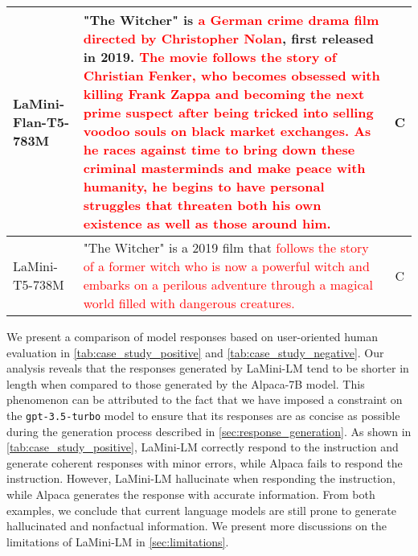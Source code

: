 \documentclass[11pt]{article}
\newcommand{\modelname}{LaMini\xspace}
\newcommand{\modelnamefull}{LaMini-LM\xspace}
\newcommand{\llm}[1]{\texttt{#1}\xspace}
\newcommand{\chatgpt}{\llm{gpt-3.5-turbo}}
\begin{document}
\begin{table*}[t]
\begin{tabular}{lp{}c}
\modelname-Flan-T5-783M & "The Witcher" is \textcolor{red}{a German crime drama film directed by Christopher Nolan}, first released in 2019. \textcolor{red}{The movie follows the story of Christian Fenker, who becomes obsessed with killing Frank Zappa and becoming the next prime suspect after being tricked into selling voodoo souls on black market exchanges. As he races against time to bring down these criminal masterminds and make peace with humanity, he begins to have personal struggles that threaten both his own existence as well as those around him.}   & C       \\ \midrule
\modelname-T5-738M & "The Witcher" is a 2019 film that \textcolor{red}{follows the story of a former witch who is now a powerful witch and embarks on a perilous adventure through a magical world filled with dangerous creatures.}   &  C \\ \bottomrule     
\end{tabular}
\caption{
Model responses to the instruction ``\texttt{Write a short description about the given movie or series: "The Witcher (2019)"}'', where \modelname language models fails but Alpaca-7B manages to respond.
The high-quality contents are highlighted in \textcolor{blue}{blue}.
The errors are highlighted in \textcolor{red}{red}.
}
\label{tab:case_study_negative}
\end{table*} 
We present a comparison of model responses based on user-oriented human evaluation in \autoref{tab:case_study_positive} and \autoref{tab:case_study_negative}. Our analysis reveals that the responses generated by \modelnamefull tend to be shorter in length when compared to those generated by the Alpaca-7B model. This phenomenon can be attributed to the fact that we have imposed a constraint on the \chatgpt model to ensure that its responses are as concise as possible during the generation process described in \autoref{sec:response_generation}. 
As shown in \autoref{tab:case_study_positive}, \modelnamefull correctly respond to the instruction and generate coherent responses with minor errors, while Alpaca fails to respond the instruction.
However, \modelnamefull hallucinate when responding the instruction, while Alpaca generates the response with accurate information.
From both examples, we conclude that current language models are still prone to generate hallucinated and nonfactual information.
We present more discussions on the limitations of \modelnamefull in \autoref{sec:limitations}.


 
\end{document}
